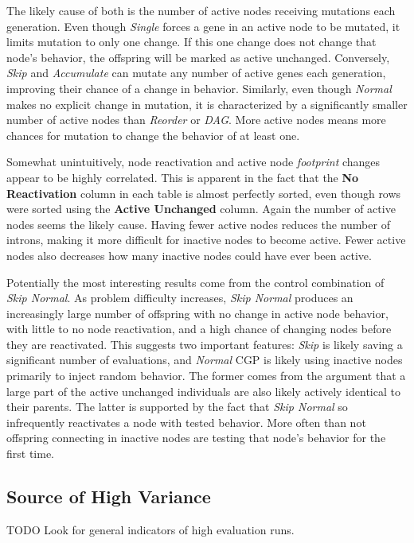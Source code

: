 \documentclass[journal]{IEEEtran}
\begin{document}
The likely cause of both is the number
of active nodes receiving mutations each generation.  Even though \emph{Single}
forces a gene in an active node to be mutated, it limits mutation to only one change.
If this one change does not change that node's behavior, the offspring will be marked
as active unchanged.  Conversely, \emph{Skip} and \emph{Accumulate} can mutate any
number of active genes each generation, improving their chance of a change in behavior.
Similarly, even though \emph{Normal} makes no explicit change in mutation, it is characterized
by a significantly smaller number of active nodes than \emph{Reorder} or \emph{DAG}.  More
active nodes means more chances for mutation to change the behavior of at least one.

Somewhat unintuitively, node reactivation and active node \emph{footprint} changes appear
to be highly correlated.  This is apparent in the fact that the \textbf{No Reactivation}
column in each table is almost perfectly sorted, even though rows were sorted using the
\textbf{Active Unchanged} column.  Again the number of active nodes seems the likely
cause.  Having fewer active nodes reduces the number of introns, making it more
difficult for inactive nodes to become active.  Fewer active nodes also decreases
how many inactive nodes could have ever been active.

Potentially the most interesting results come from the control combination of
\emph{Skip Normal}.  As problem difficulty increases, \emph{Skip Normal} produces
an increasingly large number of offspring with no change in active node behavior,
with little to no node reactivation, and a high chance of changing nodes before
they are reactivated.  This suggests two important features: \emph{Skip} is likely
saving a significant number of evaluations, and \emph{Normal} CGP is likely using
inactive nodes primarily to inject random behavior.  The former comes from the
argument that a large part of the active unchanged individuals are also likely
actively identical to their parents.  The latter is supported by the fact that
\emph{Skip Normal} so infrequently reactivates a node with tested behavior.  More
often than not offspring connecting in inactive nodes are testing that node's behavior
for the first time.

\subsection{Source of High Variance}
TODO Look for general indicators of high evaluation runs.
\end{document}
